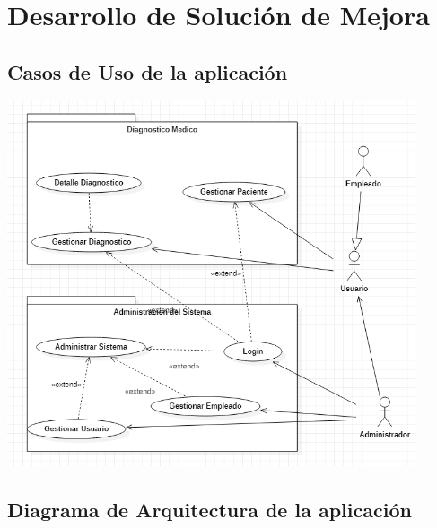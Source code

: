 \documentclass[preprint,12pt]{elsarticle}
\begin{document}
\section{Desarrollo de Solución de Mejora}
\subsection{\textbf{ Casos de Uso de la aplicación}}
\begin{center}
	\includegraphics[width=12cm]{./imagen/casouso.png} 
	\end{center}
\subsection{\textbf{ Diagrama de Arquitectura de la aplicación }}
\end{document}
